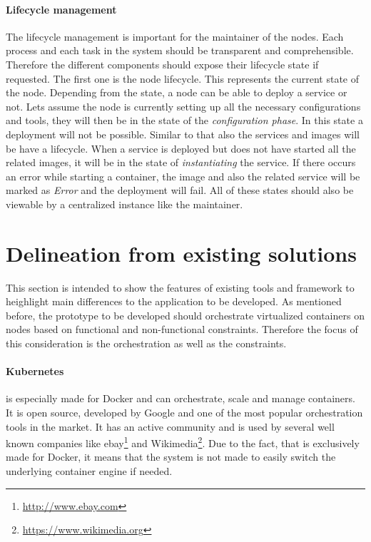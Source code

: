 \paragraph{Lifecycle management}
The lifecycle management is important for the maintainer of the nodes.
Each process and each task in the system should be transparent and comprehensible.
Therefore the different components should expose their lifecycle state if requested.
The first one is the node lifecycle.
This represents the current state of the node.
Depending from the state, a node can be able to deploy a service or not.
Lets assume the node is currently setting up all the necessary configurations and tools, they will then be in the state of the \textit{configuration phase}.
In this state a deployment will not be possible.
Similar to that also the services and images will be have a lifecycle.
When a service is deployed but does not have started all the related images, it will be in the state of \textit{instantiating} the service.
If there occurs an error while starting a container, the image and also the related service will be marked as \textit{Error} and the deployment will fail.
All of these states should also be viewable by a centralized instance like the maintainer.


\section{Delineation from existing solutions}
\label{section:delineation-from-existing-solutions}
This section is intended to show the features of existing tools and framework to heighlight main differences to the application to be developed.
As mentioned before, the prototype to be developed should orchestrate virtualized containers on nodes based on functional and non-functional constraints.
Therefore the focus of this consideration is the orchestration as well as the constraints.

\paragraph{Kubernetes} is especially made for Docker and can orchestrate, scale and manage containers.
It is open source, developed by Google and one of the most popular orchestration tools in the market.
It has an active community and is used by several well known companies\autocite{Kubernetes:Case-Studies} like ebay\footnote{\url{http://www.ebay.com}} and Wikimedia\footnote{\url{https://www.wikimedia.org}}.
Due to the fact, that is exclusively made for Docker, it means that the system is not made to easily switch the underlying container engine if needed.

